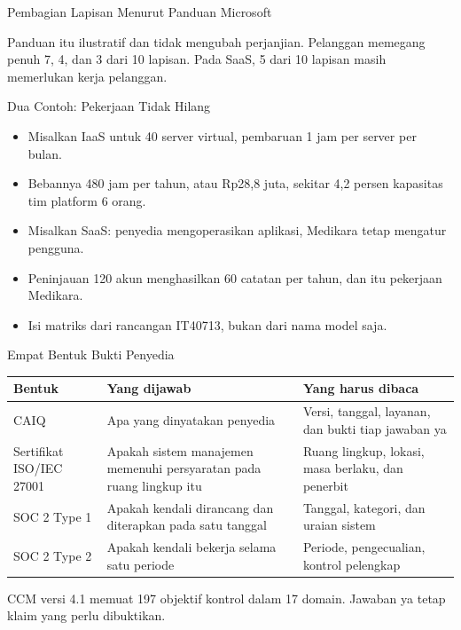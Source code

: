 \documentclass[aspectratio=169, table, 12pt]{beamer}
\begin{document}
\begin{frame}{{\Large Pembagian Lapisan Menurut Panduan Microsoft}}
  \vspace{2pt}
  \begin{center}
    \resizebox{0.72\textwidth}{!}{}
  \end{center}
  \footnotesize Panduan itu ilustratif dan tidak mengubah perjanjian. Pelanggan memegang penuh 7, 4,
  dan 3 dari 10 lapisan. Pada SaaS, 5 dari 10 lapisan masih memerlukan kerja pelanggan.
\end{frame}

\begin{frame}{{\Large Dua Contoh: Pekerjaan Tidak Hilang}}
  \vspace{6pt}
  \small
  \begin{itemize}
    \item Misalkan IaaS untuk 40 server virtual, pembaruan 1 jam per server per bulan.
    \item Bebannya 480 jam per tahun, atau Rp28,8 juta, sekitar 4,2 persen kapasitas tim platform 6
          orang.
    \item Misalkan SaaS: penyedia mengoperasikan aplikasi, Medikara tetap mengatur pengguna.
    \item Peninjauan 120 akun menghasilkan 60 catatan per tahun, dan itu pekerjaan Medikara.
    \item Isi matriks dari rancangan IT40713, bukan dari nama model saja.
  \end{itemize}
\end{frame}

\begin{frame}{{\Large Empat Bentuk Bukti Penyedia}}
  \vspace{2pt}
  \scriptsize
  \begin{tabularx}{\textwidth}{|>{\raggedright\arraybackslash}p{}|>{\raggedright\arraybackslash}X|>{\raggedright\arraybackslash}X|}
    \hline
    \textbf{Bentuk} & \textbf{Yang dijawab} & \textbf{Yang harus dibaca} \\ \hline
    CAIQ & Apa yang dinyatakan penyedia & Versi, tanggal, layanan, dan bukti tiap jawaban ya \\
    \hline
    Sertifikat ISO/IEC 27001 & Apakah sistem manajemen memenuhi persyaratan pada ruang lingkup itu &
    Ruang lingkup, lokasi, masa berlaku, dan penerbit \\ \hline
    SOC 2 Type 1 & Apakah kendali dirancang dan diterapkan pada satu tanggal & Tanggal, kategori,
    dan uraian sistem \\ \hline
    SOC 2 Type 2 & Apakah kendali bekerja selama satu periode & Periode, pengecualian, kontrol
    pelengkap \\ \hline
  \end{tabularx}

  \vspace{8pt}
  \small CCM versi 4.1 memuat 197 objektif kontrol dalam 17 domain. Jawaban ya tetap klaim yang
  perlu dibuktikan.
\end{frame}
\end{document}
